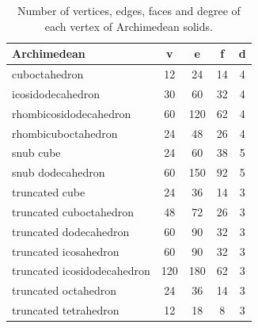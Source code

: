 \begin{highlight}
\begin{table}[H]
    \centering
    \caption{Number of vertices, edges, faces and degree of each vertex of Archimedean solids.}
    \vspace{5pt}
    \label{tab:archimedean-basic-props}
    \begin{tabular}{|l|c|c|c|c|}
    \hline
    Archimedean & v & e & f & d \\
    \hline\hline
    cuboctahedron & 12 & 24 & 14 & 4 \\
    \hline
    icosidodecahedron & 30 & 60 & 32 & 4 \\
    \hline
    rhombicosidodecahedron & 60 & 120 & 62 & 4 \\
    \hline
    rhombicuboctahedron & 24 & 48 & 26 & 4 \\
    \hline
    snub cube & 24 & 60 & 38 & 5 \\
    \hline
    snub dodecahedron & 60 & 150 & 92 & 5 \\
    \hline
    truncated cube & 24 & 36 & 14 & 3 \\
    \hline
    truncated cuboctahedron & 48 & 72 & 26 & 3 \\
    \hline
    truncated dodecahedron & 60 & 90 & 32 & 3 \\
    \hline
    truncated icosahedron & 60 & 90 & 32 & 3 \\
    \hline
    truncated icosidodecahedron & 120 & 180 & 62 & 3 \\
    \hline
    truncated octahedron & 24 & 36 & 14 & 3 \\
    \hline
    truncated tetrahedron & 12 & 18 & 8 & 3 \\
    \hline
    \end{tabular}
\end{table}

\end{highlight}